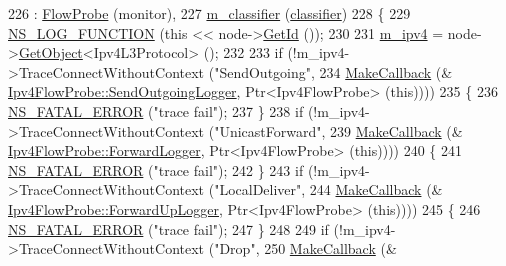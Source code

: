 \begin{DoxyCode}
226   : \hyperlink{classns3_1_1FlowProbe_ae0c5dae57bca03719808497381a24776}{FlowProbe} (monitor),
227     \hyperlink{classns3_1_1Ipv4FlowProbe_ae4e260f1b2fa6cacbab3f6fec914172e}{m\_classifier} (\hyperlink{design_8txt_af9e6b398b148789960232a87c72a107e}{classifier})
228 \{
229   \hyperlink{log-macros-disabled_8h_a90b90d5bad1f39cb1b64923ea94c0761}{NS\_LOG\_FUNCTION} (\textcolor{keyword}{this} << node->\hyperlink{classns3_1_1Node_aaf49b64a843565ce3812326313b370ac}{GetId} ());
230 
231   \hyperlink{classns3_1_1Ipv4FlowProbe_a8902eb4356b3e4a0f91b9031f80c8802}{m\_ipv4} = node->\hyperlink{classns3_1_1Object_a13e18c00017096c8381eb651d5bd0783}{GetObject}<Ipv4L3Protocol> ();
232 
233   \textcolor{keywordflow}{if} (!m\_ipv4->TraceConnectWithoutContext (\textcolor{stringliteral}{"SendOutgoing"},
234                                            \hyperlink{group__makecallbackmemptr_ga9376283685aa99d204048d6a4b7610a4}{MakeCallback} (&
      \hyperlink{classns3_1_1Ipv4FlowProbe_a4f4e830695f0b15a22bb997ff25409ed}{Ipv4FlowProbe::SendOutgoingLogger}, Ptr<Ipv4FlowProbe> (\textcolor{keyword}{this}))))
235     \{
236       \hyperlink{group__fatal_ga5131d5e3f75d7d4cbfd706ac456fdc85}{NS\_FATAL\_ERROR} (\textcolor{stringliteral}{"trace fail"});
237     \}
238   \textcolor{keywordflow}{if} (!m\_ipv4->TraceConnectWithoutContext (\textcolor{stringliteral}{"UnicastForward"},
239                                            \hyperlink{group__makecallbackmemptr_ga9376283685aa99d204048d6a4b7610a4}{MakeCallback} (&
      \hyperlink{classns3_1_1Ipv4FlowProbe_ad685ed3b3a256105f039723eef98739b}{Ipv4FlowProbe::ForwardLogger}, Ptr<Ipv4FlowProbe> (\textcolor{keyword}{this}))))
240     \{
241       \hyperlink{group__fatal_ga5131d5e3f75d7d4cbfd706ac456fdc85}{NS\_FATAL\_ERROR} (\textcolor{stringliteral}{"trace fail"});
242     \}
243   \textcolor{keywordflow}{if} (!m\_ipv4->TraceConnectWithoutContext (\textcolor{stringliteral}{"LocalDeliver"},
244                                            \hyperlink{group__makecallbackmemptr_ga9376283685aa99d204048d6a4b7610a4}{MakeCallback} (&
      \hyperlink{classns3_1_1Ipv4FlowProbe_a81ca7d15147dd7ac7b0502f37a95972e}{Ipv4FlowProbe::ForwardUpLogger}, Ptr<Ipv4FlowProbe> (\textcolor{keyword}{this}))))
245     \{
246       \hyperlink{group__fatal_ga5131d5e3f75d7d4cbfd706ac456fdc85}{NS\_FATAL\_ERROR} (\textcolor{stringliteral}{"trace fail"});
247     \}
248 
249   \textcolor{keywordflow}{if} (!m\_ipv4->TraceConnectWithoutContext (\textcolor{stringliteral}{"Drop"},
250                                            \hyperlink{group__makecallbackmemptr_ga9376283685aa99d204048d6a4b7610a4}{MakeCallback} (&

\end{DoxyCode}

